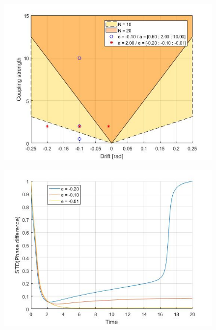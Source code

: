 \documentclass[a4paper]{scrartcl}
\begin{document}
\begin{minipage}{0.33\textwidth}
	\begin{figure}[H]
		\includegraphics[width=\textwidth]{results/6.a/ArnoldTongue.jpg}
	\end{figure}
\end{minipage}
\begin{minipage}{0.33\textwidth}
	\begin{figure}[H]
		\includegraphics[width=\textwidth]{results/6.a/N10_A_const.jpg}
	\end{figure}
\end{minipage}
\end{document}
